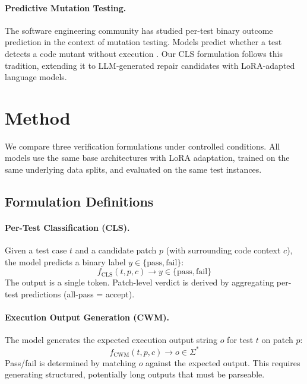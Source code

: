 \documentclass[11pt]{article}
\begin{document}
\paragraph{Predictive Mutation Testing.}
The software engineering community has studied per-test binary outcome prediction in the context of mutation testing. Models predict whether a test detects a code mutant without execution \citep{zhang2022predictive}. Our CLS formulation follows this tradition, extending it to LLM-generated repair candidates with LoRA-adapted language models.

\section{Method}
\label{sec:method}

We compare three verification formulations under controlled conditions. All models use the same base architectures with LoRA adaptation, trained on the same underlying data splits, and evaluated on the same test instances.

\subsection{Formulation Definitions}

\paragraph{Per-Test Classification (CLS).}
Given a test case $t$ and a candidate patch $p$ (with surrounding code context $c$), the model predicts a binary label $y \in \{\text{pass}, \text{fail}\}$:
\[
f_{\text{CLS}}(t, p, c) \rightarrow y \in \{\text{pass}, \text{fail}\}
\]
The output is a single token. Patch-level verdict is derived by aggregating per-test predictions (all-pass = accept).

\paragraph{Execution Output Generation (CWM).}
The model generates the expected execution output string $o$ for test $t$ on patch $p$:
\[
f_{\text{CWM}}(t, p, c) \rightarrow o \in \Sigma^*
\]
Pass/fail is determined by matching $o$ against the expected output. This requires generating structured, potentially long outputs that must be parseable.
\end{document}
